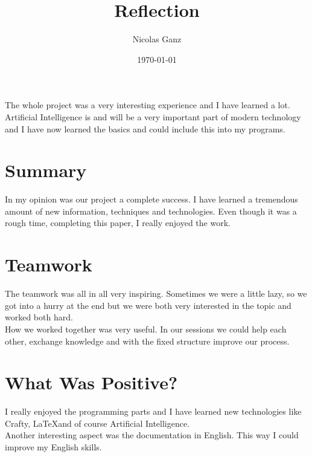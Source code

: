 %
%
%
%







\title{Reflection} %
\author{Nicolas Ganz } %
\date{\today}
\maketitle %

The whole project was a very interesting experience and I have learned a lot. Artificial Intelligence is and will be a very important part of modern technology and I have now learned the basics and could include this into my programs.

\section*{Summary}
In my opinion was our project a complete success. I have learned a tremendous amount of new information, techniques and technologies. Even though it was a rough time, completing this paper, I really enjoyed the work.

\section*{Teamwork}
The teamwork was all in all very inspiring. Sometimes we were a little lazy, so we got into a hurry at the end but we were both very interested in the topic and worked both hard.\medskip\\
How we worked together was very useful. In our sessions we could help each other, exchange knowledge and with the fixed structure improve our process.

\section*{What Was Positive?}
I really enjoyed the programming parts and I have learned new technologies like Crafty, \LaTeX and of course Artificial Intelligence.\medskip\\
Another interesting aspect was the documentation in English. This way I could improve my English skills.

